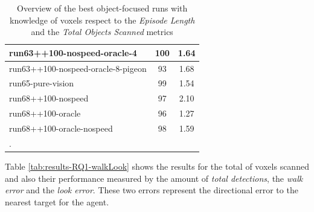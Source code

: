 \begin{longtable}{|l|c|c|}
run63++100-nospeed-oracle-4 & 100 & {\cellcolor[HTML]{A9D2CA}} \color[HTML]{000000} 1.64 \\ \hline
run63++100-nospeed-oracle-8-pigeon & 93 & {\cellcolor[HTML]{A1CFC5}} \color[HTML]{000000} 1.68 \\ \hline
run65-pure-vision & 99 & {\cellcolor[HTML]{BADBD4}} \color[HTML]{000000} 1.54 \\ \hline
run68++100-nospeed & 97 & {\cellcolor[HTML]{55AA99}} \color[HTML]{F1F1F1} 2.10 \\ \hline
run68++100-oracle & 96 & {\cellcolor[HTML]{EBF2F0}} \color[HTML]{000000} 1.27 \\ \hline
run68++100-oracle-nospeed & 98 & {\cellcolor[HTML]{B1D6CE}} \color[HTML]{000000} 1.59 \\ \hline


    \caption{Overview of the best object-focused runs with knowledge of voxels respect to the \textit{Episode Length} and the \textit{Total Objects Scanned} metrics}. \label{tab:RQ1-results}
\end{longtable}

Table \ref{tab:results-RQ1-walkLook} shows the results for the total of voxels scanned and also their performance measured by the amount of \textit{total detections}, the \textit{walk error} and the \textit{look error}. These two errors represent the directional error to the nearest target for the agent. 


